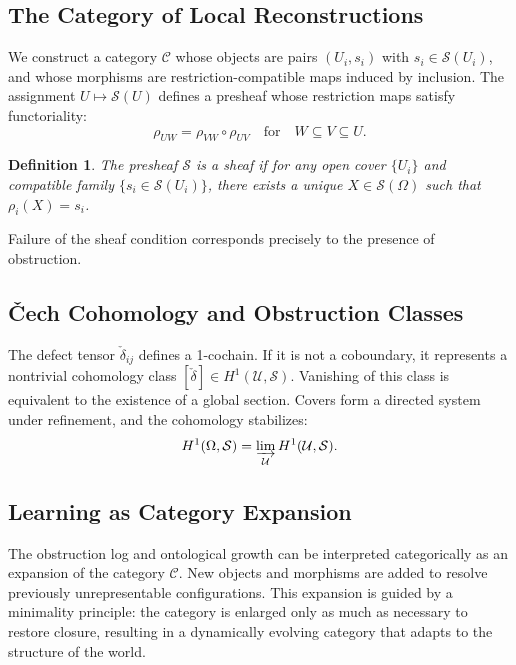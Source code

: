 \documentclass[12pt, oneside]{article}
\newtheorem{definition}{Definition}
\begin{document}
\subsection{The Category of Local Reconstructions}

We construct a category $\mathcal{C}$ whose objects are pairs $(U_i, s_i)$ with $s_i \in \mathcal{S}(U_i)$, and whose morphisms are restriction-compatible maps induced by inclusion. The assignment $U \mapsto \mathcal{S}(U)$ defines a presheaf whose restriction maps satisfy functoriality:
\[
\rho_{UW} = \rho_{VW} \circ \rho_{UV} \quad \text{for} \quad W \subseteq V \subseteq U.
\]

\begin{definition}
The presheaf $\mathcal{S}$ is a sheaf if for any open cover $\{U_i\}$ and compatible family $\{s_i \in \mathcal{S}(U_i)\}$, there exists a unique $X \in \mathcal{S}(\Omega)$ such that $\rho_i(X) = s_i$.
\end{definition}

Failure of the sheaf condition corresponds precisely to the presence of obstruction.

\subsection{\v{C}ech Cohomology and Obstruction Classes}

The defect tensor $\check{\delta}_{ij}$ defines a 1-cochain. If it is not a coboundary, it represents a nontrivial cohomology class $[\check{\delta}] \in H^1(\mathcal{U}, \mathcal{S})$. Vanishing of this class is equivalent to the existence of a global section. Covers form a directed system under refinement, and the cohomology stabilizes:
\[
H^1(\Omega, \mathcal{S}) = \varinjlim_{\mathcal{U}} H^1(\mathcal{U}, \mathcal{S}).
\]

\subsection{Learning as Category Expansion}

The obstruction log and ontological growth can be interpreted categorically as an expansion of the category $\mathcal{C}$. New objects and morphisms are added to resolve previously unrepresentable configurations. This expansion is guided by a minimality principle: the category is enlarged only as much as necessary to restore closure, resulting in a dynamically evolving category that adapts to the structure of the world.
\end{document}
